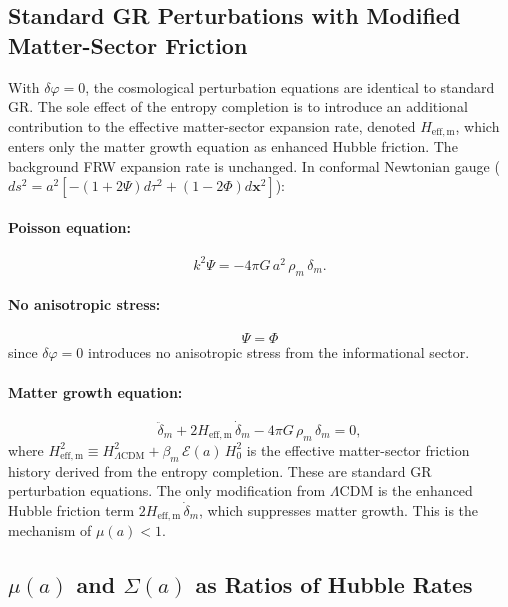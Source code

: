 \documentclass[12pt,a4paper]{article}
\begin{document}
\subsection{Standard GR Perturbations with Modified Matter-Sector Friction}

With $\delta\varphi = 0$, the cosmological perturbation equations are
identical to standard GR. The sole effect of the entropy completion
is to introduce an additional contribution to the effective
matter-sector expansion rate, denoted $H_\mathrm{eff,m}$, which
enters only the matter growth equation as enhanced Hubble friction.
The background FRW expansion rate is unchanged. In conformal
Newtonian gauge
($ds^2 = a^2[-(1+2\Psi)d\tau^2 + (1-2\Phi)d\mathbf{x}^2]$):

\paragraph{Poisson equation:}
\begin{equation}
k^2\Psi = -4\pi G\,a^2\,\rho_m\,\delta_m.
\label{eq:poisson_iam}
\end{equation}

\paragraph{No anisotropic stress:}
\begin{equation}
\Psi = \Phi
\label{eq:no_stress}
\end{equation}
since $\delta\varphi = 0$ introduces no anisotropic stress from the
informational sector.

\paragraph{Matter growth equation:}
\begin{equation}
\ddot{\delta}_m + 2H_\mathrm{eff,m}\,\dot{\delta}_m
- 4\pi G\,\rho_m\,\delta_m = 0,
\label{eq:growth_IAM}
\end{equation}
where $H_\mathrm{eff,m}^2 \equiv H_{\Lambda\mathrm{CDM}}^2
+ \beta_m\,\mathcal{E}(a)\,H_0^2$ is the effective matter-sector
friction history derived from the entropy completion.
These are standard GR perturbation equations. The only modification
from $\Lambda$CDM is the enhanced Hubble friction term
$2H_\mathrm{eff,m}\,\dot{\delta}_m$, which suppresses matter growth.
This is the mechanism of $\mu(a) < 1$.

\subsection{$\mu(a)$ and $\Sigma(a)$ as Ratios of Hubble Rates}
\end{document}
